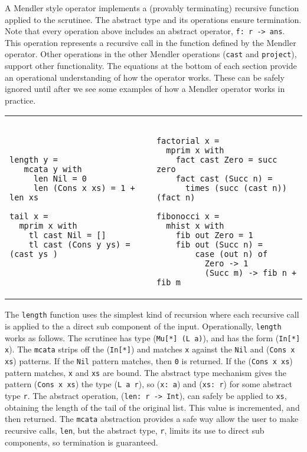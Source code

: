 A Mendler style operator implements a (provably terminating) recursive function
applied to the scrutinee. The abstract type and its operations ensure termination.
Note that every operation above includes an abstract operator, \verb+f: r -> ans+. 
This operation represents a recursive call in the function defined by the Mendler
operator. Other operations in the other Mendler operations (\verb+cast+ and \verb+project+), support other functionality. The equations
at the bottom of each section provide an operational
understanding of how the operator works. These can be safely ignored until after
we see some examples of how a Mendler operator works in practice.

\vspace*{.1in}
\begin{tabular}{l|l}
\begin{minipage}[l]{.42\linewidth}
{\small
\begin{verbatim}
length y = 
   mcata y with
     len Nil = 0
     len (Cons x xs) = 1 + len xs

tail x = 
  mprim x with
    tl cast Nil = []
    tl cast (Cons y ys) = (cast ys )
\end{verbatim}}
\end{minipage}

& 

\begin{minipage}[l]{.50\linewidth}
{\small
\begin{verbatim}

factorial x =
  mprim x with
    fact cast Zero = succ zero
    fact cast (Succ n) = 
      times (succ (cast n)) (fact n)
                      
fibonocci x =
  mhist x with
    fib out Zero = 1
    fib out (Succ n) = 
        case (out n) of
          Zero -> 1
          (Succ m) -> fib n + fib m 
\end{verbatim}}
\end{minipage}
\end{tabular}
\vspace*{.1in}

The \verb+length+ function uses the simplest kind of recursion where
each recursive call is applied to the a direct sub component of the input.
Operationally, \verb+length+ works as follows. The scrutinee
has type (\verb+Mu[*] (L a)+), and has the form (\verb+In[*] x+). The 
\verb+mcata+ strips off the (\verb+In[*]+) and matches \verb+x+ against
the \verb+Nil+ and (\verb+Cons x xs+) patterns. If the \verb+Nil+ pattern
matches, then \verb+0+ is returned. If the (\verb+Cons x xs+) pattern matches,
\verb+x+ and \verb+xs+ are bound. The abstract type mechanism gives the
pattern (\verb+Cons x xs+) the type (\verb+L a r+), so (\verb+x: a+) and
(\verb+xs: r+) for some abstract type \verb+r+. The abstract operation,
(\verb+len: r -> Int+), can safely be applied to \verb+xs+,
obtaining the length of the tail of the original list. This value
is incremented, and then returned. The \verb+mcata+ abstraction provides a safe way
allow the user to make recursive calls, \verb+len+, but the abstract type, \verb+r+,
limits its use to direct sub components, so termination is guaranteed.


